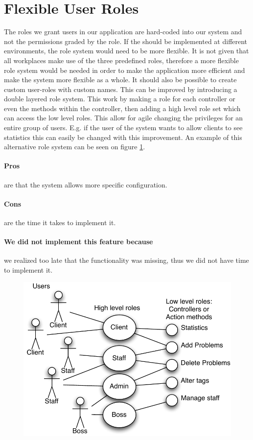 \section{Flexible User Roles}
\label{sec:agile_roles}
The roles we grant users in our application are hard-coded into our system and not the permissions graded by the role.
If the \hdesk[] should be implemented at different environments, the role system would need to be more flexible. 
It is not given that all workplaces make use of the three predefined roles, therefore a more flexible role system would be needed in order to make the application more efficient and make the system more flexible as a whole.
It should also be possible to create custom user-roles with custom names.
This can be improved by introducing a double layered role system.  
This work by making a role for each controller or even the methods within the controller, then adding a high level role set which can access the low level roles. 
This allow for agile changing the privileges for an entire group of users. 
E.g. if the user of the system wants to allow clients to see statistics this can easily be changed with this improvement. An example of this alternative role system can be seen on figure \ref{fig:improved_role_system}.

\paragraph{Pros} are that the system allows more specific configuration. 
\paragraph{Cons} are the time it takes to implement it.
\paragraph{We did not implement this feature because} we realized too late that the functionality was missing, thus we did not have time to implement it.

\begin{figure}
\begin{center}
\includegraphics[scale=1]{input/epilogue/improvements/improved_role_system.pdf}
\label{fig:improved_role_system}
\end{center}
\end{figure}
